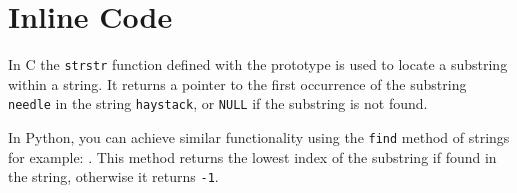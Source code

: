 \section{Inline Code}\label{inline-code}

In C the \texttt{strstr} function defined with the prototype
{\ttfamily {}
} is
used to locate a substring within a string. It returns a pointer to the first occurrence of the substring
\texttt{needle} in the string \texttt{haystack}, or \texttt{NULL} if the substring is not found.

In Python, you can achieve similar functionality using the \texttt{find} method of strings for example: {\ttfamily {}
}. This method returns the lowest index of the substring if found in the string, otherwise it returns \texttt{-\allowbreak{}1}.
